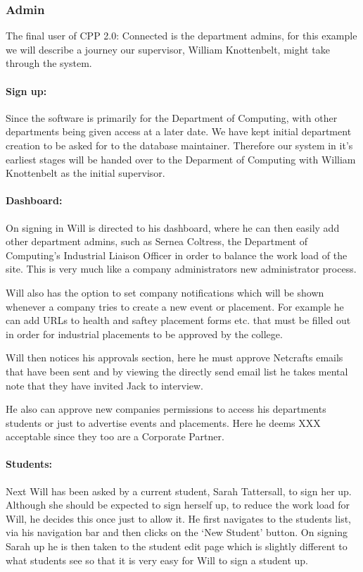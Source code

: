 \subsubsection{Admin}
  The final user of CPP 2.0: Connected is the department admins, for this example we will describe a journey our supervisor, William Knottenbelt, might take through the system.
  \paragraph{Sign up:}
    Since the software is primarily for the Department of Computing, with other departments being given access at a later date. We have kept initial department creation to be asked for to the database maintainer. 
    Therefore our system in it's earliest stages will be handed over to the Deparment of Computing with William Knottenbelt as the initial supervisor. 

  \paragraph{Dashboard:}
    On signing in Will is directed to his dashboard, where he can then easily add other department admins, such as Sernea Coltress, the Department of Computing's Industrial Liaison Officer in order to balance the work load of the site. This is very much like a company administrators new administrator process.


    Will also has the option to set company notifications which will be shown whenever a company tries to create a new event or placement. For example he can add URLs to health and saftey placement forms etc. that must be filled out in order for industrial placements to be approved by the college. 

    Will then notices his approvals section, here he must approve Netcrafts emails that have been sent and by viewing the directly send email list he takes mental note that they have invited Jack to interview. 

    He also can approve new companies permissions to access his departments students or just to advertise events and placements. Here he deems XXX acceptable since they too are a Corporate Partner.

  \paragraph{Students:}
    Next Will has been asked by a current student, Sarah Tattersall, to sign her up. Although she should be expected to sign herself up, to reduce the work load for Will, he decides this once just to allow it.
    He first navigates to the students list, via his navigation bar and then clicks on the `New Student' button.
    On signing Sarah up he is then taken to the student edit page which is slightly different to what students see so that it is very easy for Will to sign a student up.

